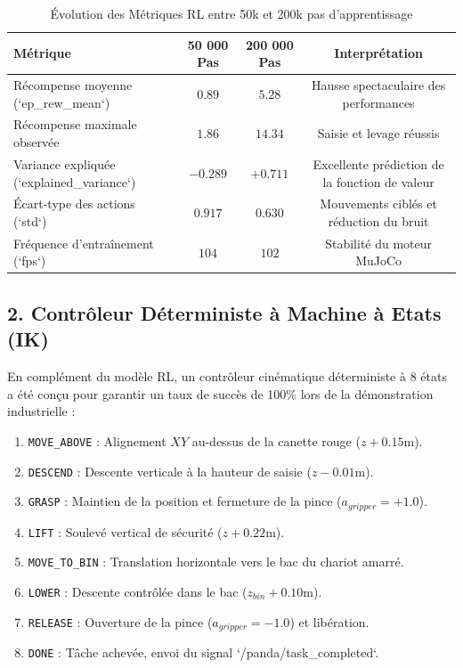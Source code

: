 \documentclass[11pt,a4paper]{article}
\begin{document}
\begin{table}[h!]
\centering
\caption{Évolution des Métriques RL entre 50k et 200k pas d'apprentissage}
\begin{tabular}{lccc}
\toprule
\textbf{Métrique} & \textbf{50 000 Pas} & \textbf{200 000 Pas} & \textbf{Interprétation} \\
\midrule
Récompense moyenne (`ep_rew_mean`) & $0.89$ & \textbf{$5.28$} & Hausse spectaculaire des performances \\
Récompense maximale observée & $1.86$ & \textbf{$14.34$} & Saisie et levage réussis \\
Variance expliquée (`explained_variance`) & $-0.289$ & \textbf{$+0.711$} & Excellente prédiction de la fonction de valeur \\
Écart-type des actions (`std`) & $0.917$ & \textbf{$0.630$} & Mouvements ciblés et réduction du bruit \\
Fréquence d'entraînement (`fps`) & $104$ & \textbf{$102$} & Stabilité du moteur MuJoCo \\
\bottomrule
\end{tabular}
\end{table}

\subsection{2. Contrôleur Déterministe à Machine à Etats (IK)}
En complément du modèle RL, un contrôleur cinématique déterministe à 8 états a été conçu pour garantir un taux de succès de 100\% lors de la démonstration industrielle :
\begin{enumerate}
    \item \texttt{MOVE\_ABOVE} : Alignement $XY$ au-dessus de la canette rouge ($z + 0.15\text{m}$).
    \item \texttt{DESCEND} : Descente verticale à la hauteur de saisie ($z - 0.01\text{m}$).
    \item \texttt{GRASP} : Maintien de la position et fermeture de la pince ($a_{gripper} = +1.0$).
    \item \texttt{LIFT} : Soulevé vertical de sécurité ($z + 0.22\text{m}$).
    \item \texttt{MOVE\_TO\_BIN} : Translation horizontale vers le bac du chariot amarré.
    \item \texttt{LOWER} : Descente contrôlée dans le bac ($z_{bin} + 0.10\text{m}$).
    \item \texttt{RELEASE} : Ouverture de la pince ($a_{gripper} = -1.0$) et libération.
    \item \texttt{DONE} : Tâche achevée, envoi du signal `/panda/task_completed`.
\end{enumerate}
\end{document}
